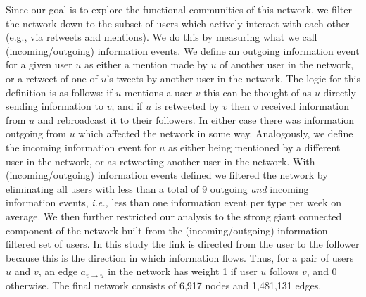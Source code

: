 Since our goal is to explore the functional communities of this network, we filter the network down to the subset of users which actively interact with each other (e.g., via retweets and mentions). We do this by measuring what we call (incoming/outgoing) information events. We define an outgoing information event for a given user $u$ as either a mention made by $u$ of another user in the network, or a retweet of one of $u$'s tweets by another user in the network. The logic for this definition is as follows: if $u$ mentions a user $v$ this can be thought of as $u$ directly sending information to $v$, and if $u$ is retweeted by $v$ then $v$ received information from $u$ and rebroadcast it to their followers. In either case there was information outgoing from $u$ which affected the network in some way. Analogously, we define the incoming information event for $u$ as either being mentioned by a different user in the network, or as retweeting another user in the network.
With (incoming/outgoing) information events defined we filtered the network by eliminating all users with less than a total of 9 outgoing \emph{and} incoming information events, {\it i.e.,} less than one information event per type per week on average. 
We then further restricted our analysis to the strong giant connected component of the network built from the (incoming/outgoing) information filtered set of users. %
In this study the link is directed from the user to the follower because this is the direction in which information flows. Thus, for a pair of users $u$ and $v$, an edge $a_{v \to u}$ in the \DIFdelbegin {}\DIFdelend \DIFaddbegin {}\DIFaddend network has weight 1 if user $u$ follows $v$, and 0 otherwise. The final network consists of 6,917 nodes and 1,481,131 edges.

